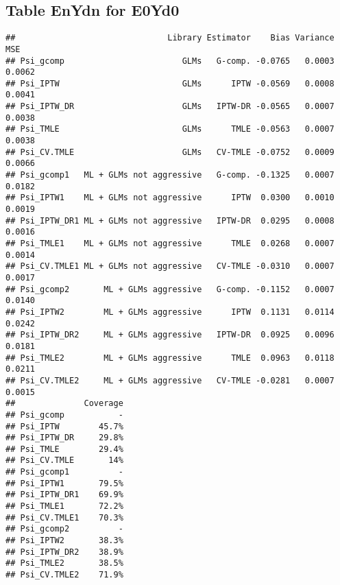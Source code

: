 \documentclass[11pt]{article}\usepackage[]{graphicx}\usepackage[]{color}
\makeatletter
\newenvironment{kframe}{%
 \def\at@end@of@kframe{}%
 \ifinner\ifhmode%
  \def\at@end@of@kframe{\end{minipage}}%
  \begin{minipage}{\columnwidth}%
 \fi\fi%
 \def\FrameCommand##1{\hskip\@totalleftmargin \hskip-\fboxsep
 \colorbox{shadecolor}{##1}\hskip-\fboxsep
     \hskip-\linewidth \hskip-\@totalleftmargin \hskip\columnwidth}%
 \MakeFramed {\advance\hsize-\width
   \@totalleftmargin\z@ \linewidth\hsize
   \@setminipage}}%
 {\par\unskip\endMakeFramed%
 \at@end@of@kframe}
\newenvironment{knitrout}{}{} %
\makeatother
\begin{document}
\subsection{Table EnYdn for E0Yd0}
\begin{knitrout}
\color{fgcolor}\begin{kframe}
\begin{verbatim}
##                               Library Estimator    Bias Variance    MSE
## Psi_gcomp                        GLMs   G-comp. -0.0765   0.0003 0.0062
## Psi_IPTW                         GLMs      IPTW -0.0569   0.0008 0.0041
## Psi_IPTW_DR                      GLMs   IPTW-DR -0.0565   0.0007 0.0038
## Psi_TMLE                         GLMs      TMLE -0.0563   0.0007 0.0038
## Psi_CV.TMLE                      GLMs   CV-TMLE -0.0752   0.0009 0.0066
## Psi_gcomp1   ML + GLMs not aggressive   G-comp. -0.1325   0.0007 0.0182
## Psi_IPTW1    ML + GLMs not aggressive      IPTW  0.0300   0.0010 0.0019
## Psi_IPTW_DR1 ML + GLMs not aggressive   IPTW-DR  0.0295   0.0008 0.0016
## Psi_TMLE1    ML + GLMs not aggressive      TMLE  0.0268   0.0007 0.0014
## Psi_CV.TMLE1 ML + GLMs not aggressive   CV-TMLE -0.0310   0.0007 0.0017
## Psi_gcomp2       ML + GLMs aggressive   G-comp. -0.1152   0.0007 0.0140
## Psi_IPTW2        ML + GLMs aggressive      IPTW  0.1131   0.0114 0.0242
## Psi_IPTW_DR2     ML + GLMs aggressive   IPTW-DR  0.0925   0.0096 0.0181
## Psi_TMLE2        ML + GLMs aggressive      TMLE  0.0963   0.0118 0.0211
## Psi_CV.TMLE2     ML + GLMs aggressive   CV-TMLE -0.0281   0.0007 0.0015
##              Coverage
## Psi_gcomp           -
## Psi_IPTW        45.7%
## Psi_IPTW_DR     29.8%
## Psi_TMLE        29.4%
## Psi_CV.TMLE       14%
## Psi_gcomp1          -
## Psi_IPTW1       79.5%
## Psi_IPTW_DR1    69.9%
## Psi_TMLE1       72.2%
## Psi_CV.TMLE1    70.3%
## Psi_gcomp2          -
## Psi_IPTW2       38.3%
## Psi_IPTW_DR2    38.9%
## Psi_TMLE2       38.5%
## Psi_CV.TMLE2    71.9%
\end{verbatim}
\end{kframe}
\end{knitrout}
\end{document}
